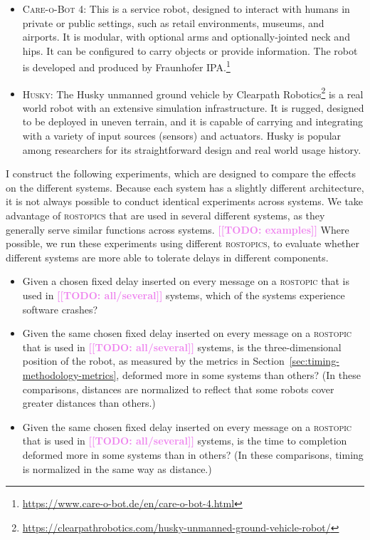\documentclass[conference]{IEEEtran}
\newcommand{\todo}[1]{\textcolor{violet}{{\bfseries [[TODO: #1]]}}}
\newcommand{\tool}[1]{\textsc{#1}}
\begin{document}
\begin{itemize}
\item{\tool{Care-o-Bot 4}:} This is a service robot, designed to interact with humans in private or public settings, such as retail environments, museums, and airports. It is modular, with optional arms and optionally-jointed neck and hips. It can be configured to carry objects or provide information. The robot is developed and produced by Fraunhofer IPA.\footnote{\url{https://www.care-o-bot.de/en/care-o-bot-4.html}}


\item{\tool{Husky}:} The Husky unmanned ground vehicle by Clearpath Robotics\footnote{\url{https://clearpathrobotics.com/husky-unmanned-ground-vehicle-robot/}} is a real world robot with an extensive simulation infrastructure. It is rugged, designed to be deployed in uneven terrain, and it is capable of carrying and integrating with a variety of input sources (sensors) and actuators. Husky is popular among researchers for its straightforward design and real world usage history.

\end{itemize}

I construct the following experiments, which are designed to compare the effects on the different systems. 
Because each system has a slightly different architecture, it is not always possible to
conduct identical experiments across systems.
We take advantage of \tool{rostopics} that are used in several different systems,
as they generally serve similar functions across systems. 
\todo{examples}
Where possible, we run these experiments using different \tool{rostopics}, to 
evaluate whether different systems are more able to tolerate delays in different 
components.

\begin{itemize}
\item Given a chosen fixed delay inserted on every message on a \tool{rostopic} that is used in \todo{all/several} systems, which of the systems experience software crashes?
\item Given the same chosen fixed delay inserted on every message on a \tool{rostopic} that
is used in \todo{all/several} systems, is the three-dimensional position of the
robot, as measured by the metrics in Section~\ref{sec:timing-methodology-metrics},
deformed more in some systems than others? (In these comparisons, distances are
normalized to reflect that some robots cover greater distances than others.)
\item Given the same chosen fixed delay inserted on every message on a \tool{rostopic} that
is used in \todo{all/several} systems, is the time to completion deformed more in
some systems than in others? (In these comparisons, timing is normalized in the same way as distance.)
\end{itemize}
\end{document}

